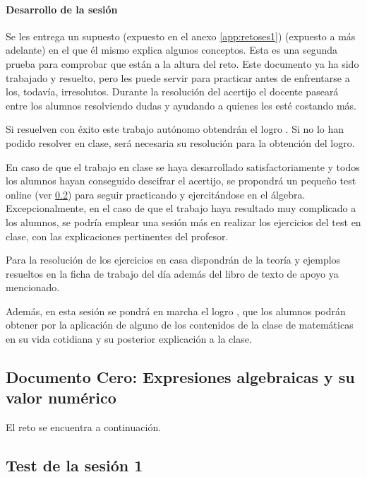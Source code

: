 \paragraph{Desarrollo de la sesión} 

Se les entrega un supuesto  
%
\ifinapp
	(expuesto en el anexo \ref{app:retoses1})
\else 
	(expuesto a más adelante)
\fi 
%
en el que él mismo explica algunos conceptos.
%
Esta es una segunda prueba para comprobar que están a la altura del reto.
%
Este documento ya ha sido trabajado y resuelto, pero les puede servir para practicar antes de enfrentarse a los, todavía, irresolutos.
%
Durante la resolución del acertijo el docente paseará entre los alumnos resolviendo dudas y ayudando a quienes les esté costando más. 

Si resuelven con éxito este trabajo autónomo obtendrán el logro .
%
Si no lo han podido resolver en clase, será necesaria su resolución para la obtención del logro.

En caso de que el trabajo en clase se haya desarrollado satisfactoriamente y todos los alumnos hayan conseguido descifrar el acertijo, se propondrá un pequeño test online (ver \ref{test:ses1}) para seguir practicando y ejercitándose en el álgebra.
%
Excepcionalmente, en el caso de que el trabajo haya resultado muy complicado a los alumnos, se podría emplear una sesión más en realizar los ejercicios del test en clase, con las explicaciones pertinentes del profesor.

Para la resolución de los ejercicios en casa dispondrán de la teoría y ejemplos resueltos en la ficha de trabajo del día además del libro de texto de apoyo ya mencionado.

Además, en esta sesión se pondrá en marcha el logro , que los alumnos podrán obtener por la aplicación de alguno de los contenidos de la clase de matemáticas en su vida cotidiana y su posterior explicación a la clase.

\ifinapp
\else
	\subsection{Documento Cero: Expresiones algebraicas y su valor numérico}
	\label{app:DocModel}
	El reto se encuentra a continuación.
	
\fi


\subsection{Test de la sesión 1}
\label{test:ses1}

